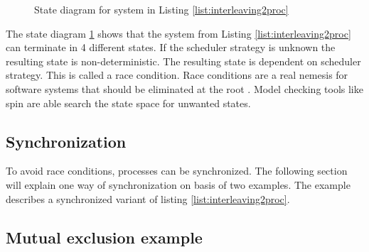 \documentclass[12pt,a4paper,twoside]{article}
\begin{document}
\begin{figure}
{
}
 \caption{State diagram for system in Listing \ref{list:interleaving2proc}}
\label{fig:interleavingtransitionsystem}
 \end{figure}

The state diagram \ref{fig:interleavingtransitionsystem} shows that the system from Listing \ref{list:interleaving2proc} can terminate in 4 different states. If the scheduler strategy is unknown the resulting state is non-deterministic. The resulting state is dependent on scheduler strategy. This is called a race condition. Race conditions are a real nemesis for software systems that should be eliminated at the root \cite{subra11}. Model checking tools like spin are able search the state space for unwanted states. 

\subsection{Synchronization}
\label{sec:synchronization}

To avoid race conditions, processes can be synchronized. The following section will explain one way of synchronization on basis of two examples. The example describes a synchronized variant of listing \ref{list:interleaving2proc}.

\subsection{Mutual exclusion example}
\label{sec:syncexample}
\end{document}
